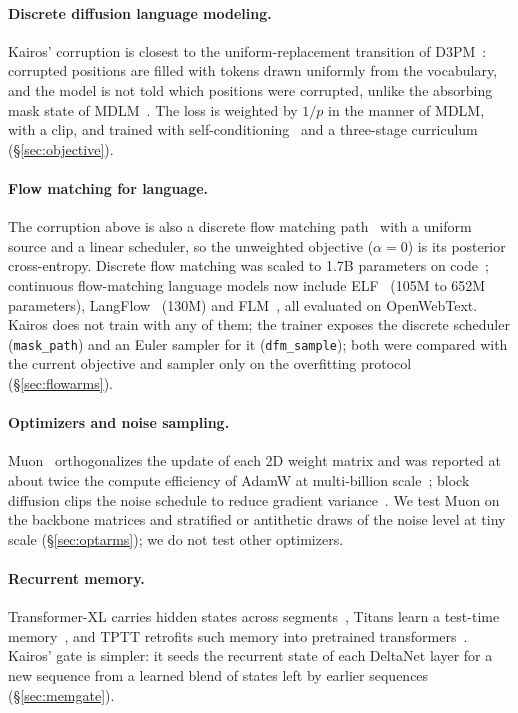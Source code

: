 \documentclass[11pt]{article}
\begin{document}
\paragraph{Discrete diffusion language modeling.} Kairos' corruption is
closest to the uniform-replacement transition of D3PM~\citep{austin2021d3pm}:
corrupted positions are filled with tokens drawn uniformly from the
vocabulary, and the model is not told which positions were corrupted, unlike
the absorbing mask state of MDLM~\citep{sahoo2024mdlm}. The loss is weighted
by $1/p$ in the manner of MDLM, with a clip, and trained with
self-conditioning~\citep{chen2022analogbits} and a three-stage curriculum
(\S\ref{sec:objective}).

\paragraph{Flow matching for language.} The corruption above is also a discrete flow matching
path~\citep{gat2024dfm} with a uniform source and a linear scheduler, so the unweighted
objective ($\alpha=0$) is its posterior cross-entropy. Discrete flow matching was scaled to
1.7B parameters on code~\citep{gat2024dfm}; continuous flow-matching language models
now include ELF~\citep{hu2026elf} (105M to 652M parameters), LangFlow~\citep{chen2026langflow}
(130M) and FLM~\citep{lee2026flowmaplm}, all evaluated on OpenWebText. Kairos
does not train with any of them; the trainer exposes the discrete scheduler (\texttt{mask\_path}) and
an Euler sampler for it (\texttt{dfm\_sample}); both were compared with the current objective and sampler only on the overfitting protocol (\S\ref{sec:flowarms}).

\paragraph{Optimizers and noise sampling.} Muon~\citep{jordan2024muon} orthogonalizes the update of each 2D weight
matrix and was reported at about twice the compute efficiency of AdamW at multi-billion scale~\citep{liu2025muon};
block diffusion clips the noise schedule to reduce gradient variance~\citep{arriola2025bd3lm}. We test Muon on the
backbone matrices and stratified or antithetic draws of the noise level at tiny scale (\S\ref{sec:optarms}); we do not
test other optimizers.

\paragraph{Recurrent memory.} Transformer-XL carries hidden states across
segments~\citep{dai2019transformerxl}, Titans learn a test-time
memory~\citep{behrouz2025titans}, and TPTT retrofits such memory into
pretrained transformers~\citep{furfaro2025tptt}. Kairos' gate is simpler: it
seeds the recurrent state of each DeltaNet layer for a new sequence from a
learned blend of states left by earlier sequences (\S\ref{sec:memgate}).
\end{document}
